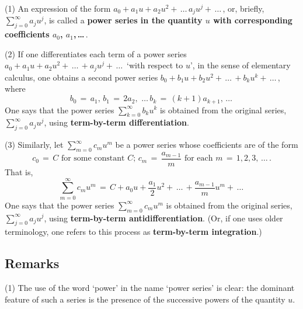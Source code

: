 \V

        (1) An expression of the form $a_{0} + a_{1}u + a_{2}u^{2} + \,{\ldots}\, a_{j}u^{j} + \,{\ldots}\,$, or, briefly, $\sum_{j=0}^{{\infty}} a_{j}u^{j}$,
    is called a {\bf power series in the quantity $u$ with corresponding coefficients $a_{0}$, $a_{1}$,\,{\ldots}\,}.

\V

        (2) If one differentiates each term of a power series $a_{0} + a_{1}u + a_{2}u^{2} + \,{\ldots}\, + a_{j}u^{j} +\,{\ldots}\,$ `with respect to $u$',
    in the sense of elementary calculus, one obtains a second power series $b_{0} + b_{1}u + b_{2}u^{2} + \,{\ldots}\, + b_{k}u^{k} + \,{\ldots}\,$,
    where
        \begin{displaymath}
        b_{0} \,=\, a_{1}, \, b_{1} \,=\, 2a_{2}, \, \,{\ldots}\,b_{k} \,=\, (k+1)a_{k+1}, \,{\ldots}\,
        \end{displaymath}
    One says that the power series $\sum_{k=0}^{{\infty}} b_{k}u^{k}$ is obtained from the original series,
    $\sum_{j=0}^{{\infty}} a_{j}u^{j}$, using {\bf term-by-term differentiation}.

\V

        (3) Similarly, let $\sum_{m=0}^{{\infty}} c_{m}u^{m}$ be a power series whose coefficients are of the form
        \begin{displaymath}
        c_{0} \,=\, C \mbox{ for some constant $C$};\, 
        c_{m} \,=\, \frac{a_{m-1}}{m} \mbox{ for each $m \,=\, 1,2,3,\,{\ldots}\,$}.
        \end{displaymath}
    That is,
        \begin{displaymath}
        \sum_{m=0}^{{\infty}} c_{m}u^{m} \,=\, C + a_{0}u
 + \frac{a_{1}}{2}u^{2} + \,{\ldots}\, + \frac{a_{m-1}}{m}u^{m} + \,{\ldots}\,
        \end{displaymath}
    One says that the power series $\sum_{m=0}^{{\infty}} c_{m}u^{m}$ is obtained from the original series, $\sum_{j=0}^{{\infty}} a_{j}u^{j}$, using {\bf term-by-term antidifferentiation}.
    (Or, if one uses older terminology, one refers to this process as {\bf term-by-term integration}.)
    

        \subsection{\small{{\bf Remarks}}}
        \label{RemrkG30.140}

\V

\hspace*{\parindent}(1) The use of the word `power' in the name `power series' is clear:
    the dominant feature of such a series is the presence of the successive powers of the quantity $u$.

